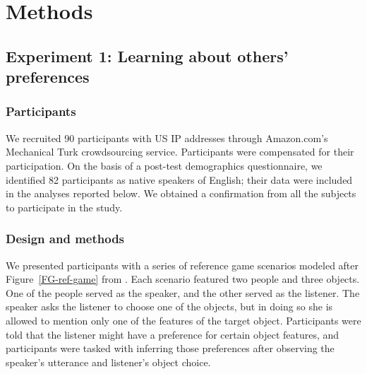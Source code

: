 \documentclass[10pt,a4paper]{article}
\begin{document}

\section*{Methods}


\subsection*{Experiment 1: Learning about others' preferences}

\subsubsection*{Participants}

We recruited 90 participants with US IP addresses through Amazon.com's Mechanical Turk crowdsourcing service. Participants were compensated for their participation. On the basis of a post-test demographics questionnaire, we identified 82 participants as native speakers of English; their data were included in the analyses reported below. We obtained a confirmation from all the subjects to participate in the study.

\subsubsection*{Design and methods}

We presented participants with a series of reference game scenarios modeled after Figure~\ref{FG-ref-game} from .
Each scenario featured two people and three objects.
One of the people served as the speaker, and the other served as the listener. The speaker asks the listener to choose one of the objects, but in doing so she is allowed to mention only one of the features of the target object. Participants were told that the listener might have a preference for certain object features, and participants were tasked with inferring those preferences after observing the speaker's utterance and listener's object choice.
\end{document}

